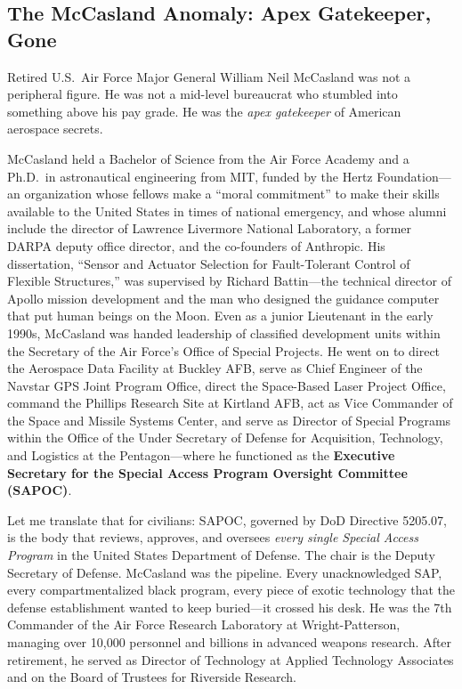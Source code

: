 \documentclass[11pt,a4paper]{article}
\begin{document}
\subsection{The McCasland Anomaly: Apex Gatekeeper, Gone}

Retired U.S.\ Air Force Major General William Neil McCasland was not a peripheral figure. He was not a mid-level bureaucrat who stumbled into something above his pay grade. He was the \textit{apex gatekeeper} of American aerospace secrets.

McCasland held a Bachelor of Science from the Air Force Academy and a Ph.D.\ in astronautical engineering from MIT, funded by the Hertz Foundation---an organization whose fellows make a ``moral commitment'' to make their skills available to the United States in times of national emergency, and whose alumni include the director of Lawrence Livermore National Laboratory, a former DARPA deputy office director, and the co-founders of Anthropic. His dissertation, ``Sensor and Actuator Selection for Fault-Tolerant Control of Flexible Structures,'' was supervised by Richard Battin---the technical director of Apollo mission development and the man who designed the guidance computer that put human beings on the Moon. Even as a junior Lieutenant in the early 1990s, McCasland was handed leadership of classified development units within the Secretary of the Air Force's Office of Special Projects. He went on to direct the Aerospace Data Facility at Buckley AFB, serve as Chief Engineer of the Navstar GPS Joint Program Office, direct the Space-Based Laser Project Office, command the Phillips Research Site at Kirtland AFB, act as Vice Commander of the Space and Missile Systems Center, and serve as Director of Special Programs within the Office of the Under Secretary of Defense for Acquisition, Technology, and Logistics at the Pentagon---where he functioned as the \textbf{Executive Secretary for the Special Access Program Oversight Committee (SAPOC)}.

Let me translate that for civilians: SAPOC, governed by DoD Directive 5205.07, is the body that reviews, approves, and oversees \textit{every single Special Access Program} in the United States Department of Defense. The chair is the Deputy Secretary of Defense. McCasland was the pipeline. Every unacknowledged SAP, every compartmentalized black program, every piece of exotic technology that the defense establishment wanted to keep buried---it crossed his desk. He was the 7th Commander of the Air Force Research Laboratory at Wright-Patterson, managing over 10,000 personnel and billions in advanced weapons research. After retirement, he served as Director of Technology at Applied Technology Associates and on the Board of Trustees for Riverside Research.
\end{document}
